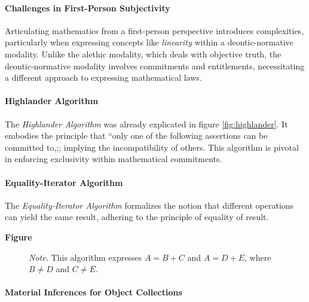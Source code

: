 \documentclass[12pt]{book}
\begin{document}
\paragraph{Challenges in First-Person Subjectivity}

Articulating mathematics from a first-person perspective introduces complexities, particularly when expressing concepts like \textit{linearity} within a deontic-normative modality. Unlike the alethic modality, which deals with objective truth, the deontic-normative modality involves commitments and entitlements, necessitating a different approach to expressing mathematical laws.

\paragraph{Highlander Algorithm}\label{highlander-algorithm}

The \textit{Highlander Algorithm} was already explicated in figure \ref{fig:highlander}. It embodies the principle that ``only one of the following assertions can be committed to,;; implying the incompatibility of others. This algorithm is pivotal in enforcing exclusivity within mathematical commitments.

\paragraph{Equality-Iterator Algorithm}\label{equality-iterator-algorithm}

The \textit{Equality-Iterator Algorithm} formalizes the notion that different operations can yield the same result, adhering to the principle of equality of result.

\textbf{Figure}

\begin{figure}[H]
\caption{\textit{Note. }This algorithm expresses \(A = B + C\) and \(A = D + E\), where \(B \neq D\) and \(C \neq E\).}
\label{fig:EqualityIterator}
\end{figure}

\paragraph{Material Inferences for Object Collections}

\end{document}
